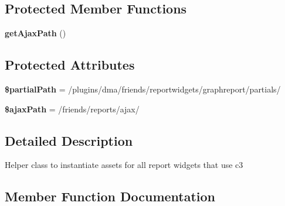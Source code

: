 \subsection*{Protected Member Functions}
\begin{DoxyCompactItemize}
\item 
\hypertarget{classDMA_1_1Friends_1_1ReportWidgets_1_1GraphReport_ac68b6e08f9826d30c2aa23aa3cc54854}{}{\bfseries get\+Ajax\+Path} ()\label{classDMA_1_1Friends_1_1ReportWidgets_1_1GraphReport_ac68b6e08f9826d30c2aa23aa3cc54854}

\end{DoxyCompactItemize}
\subsection*{Protected Attributes}
\begin{DoxyCompactItemize}
\item 
\hypertarget{classDMA_1_1Friends_1_1ReportWidgets_1_1GraphReport_ae3d93edd42d9e767b4489f3df2ff6173}{}{\bfseries \$partial\+Path} = \textquotesingle{}/plugins/dma/friends/reportwidgets/graphreport/partials/\textquotesingle{}\label{classDMA_1_1Friends_1_1ReportWidgets_1_1GraphReport_ae3d93edd42d9e767b4489f3df2ff6173}

\item 
\hypertarget{classDMA_1_1Friends_1_1ReportWidgets_1_1GraphReport_a0da3cb0b678025e674295784c6129772}{}{\bfseries \$ajax\+Path} = \textquotesingle{}/friends/reports/ajax/\textquotesingle{}\label{classDMA_1_1Friends_1_1ReportWidgets_1_1GraphReport_a0da3cb0b678025e674295784c6129772}

\end{DoxyCompactItemize}


\subsection{Detailed Description}
Helper class to instantiate assets for all report widgets that use c3 

\subsection{Member Function Documentation}
\hypertarget{classDMA_1_1Friends_1_1ReportWidgets_1_1GraphReport_a750a6e7451bc98f22bdb38e3ad091bb7}{}
